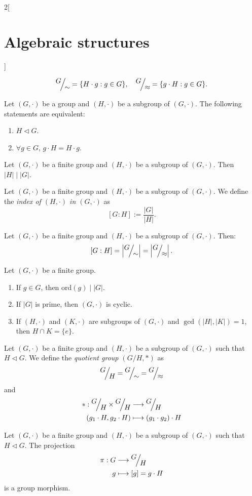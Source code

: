 \documentclass[../../../main.tex]{subfiles}
\begin{document}
\begin{multicols}{2}[\section{Algebraic structures}]
\begin{definition}
    $$\quot{G}{\sim}=\{H\cdot g:g\in G\},\quad\quot{G}{\approx}=\{g\cdot H:g\in G\}.$$
\end{definition}
\begin{prop}
    Let $(G,\cdot)$ be a group and $(H,\cdot)$ be a subgroup of $(G,\cdot)$. The following statements are equivalent:
    \begin{enumerate}
        \item $H\lhd G$.
        \item $\forall g\in G$, $g\cdot H=H\cdot g$.
    \end{enumerate}
\end{prop}
\begin{theorem}
    Let $(G,\cdot)$ be a finite group and $(H,\cdot)$ be a subgroup of $(G,\cdot)$. Then $|H|\mid|G|$.
\end{theorem}
\begin{definition}
    Let $(G,\cdot)$ be a finite group and $(H,\cdot)$ be a subgroup of $(G,\cdot)$. We define the \textit{index of $(H,\cdot)$ in $(G,\cdot)$} as $$[G:H]:=\frac{|G|}{|H|}.$$
\end{definition}
\begin{corollary}
    Let $(G,\cdot)$ be a finite group and $(H,\cdot)$ be a subgroup of $(G,\cdot)$. Then: $$[G:H]=\left|\quot{G}{\sim}\right|=\left|\quot{G}{\approx}\right|.$$
\end{corollary}
\begin{corollary}
    Let $(G,\cdot)$ be a finite group. 
    \begin{enumerate}
        \item If $g\in G$, then $\text{ord}(g)\mid |G|$.
        \item If $|G|$ is prime, then $(G,\cdot)$ is cyclic.
        \item If $(H,\cdot)$ and $(K,\cdot)$ are subgroups of $(G,\cdot)$ and $\gcd(|H|,|K|)=1$, then $H\cap K=\{e\}$.
    \end{enumerate}
\end{corollary}
\begin{definition}
    Let $(G,\cdot)$ be a finite group and $(H,\cdot)$ be a subgroup of $(G,\cdot)$ such that $H\lhd G$. We define the \textit{quotient group $\left(G/H,*\right)$} as $$\quot{G}{H}=\quot{G}{\sim}=\quot{G}{\approx}$$ and 
\begin{align*}
    *:\quot{G}{H}\times\quot{G}{H}&\longrightarrow\quot{G}{H}\\
    (g_1\cdot H,g_2\cdot H)&\longmapsto (g_1\cdot g_2)\cdot H
\end{align*}
\end{definition}
\begin{lemma}
Let $(G,\cdot)$ be a finite group and $(H,\cdot)$ be a subgroup of $(G,\cdot)$ such that $H\lhd G$. The projection 
\begin{align*}
    \pi:G&\longrightarrow\quot{G}{H}\\
    g&\longmapsto[g]=g\cdot H
\end{align*}
is a group morphism.
\end{lemma}

\end{multicols}
\end{document}
